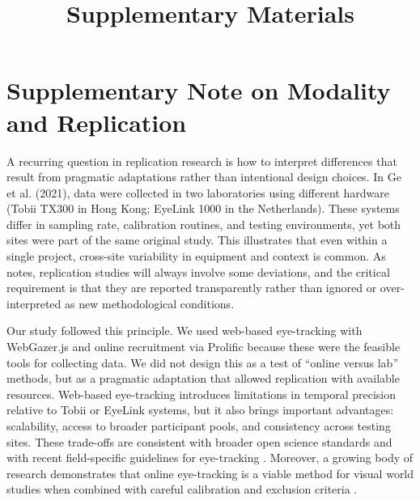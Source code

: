 \documentclass[sn-apa]{sn-jnl} %
\begin{document}
\title[Supplementary Materials]{Supplementary Materials}

\maketitle

\section{Supplementary Note on Modality and Replication}

A recurring question in replication research is how to interpret differences
that result from pragmatic adaptations rather than intentional design choices.
In Ge et al. (2021), data were collected in two laboratories using different
hardware (Tobii TX300 in Hong Kong; EyeLink 1000 in the Netherlands). These
systems differ in sampling rate, calibration routines, and testing environments,
yet both sites were part of the same original study. This illustrates that even
within a single project, cross-site variability in equipment and context is
common. As \textcite{mcmanus2024} notes, replication studies will always involve
some deviations, and the critical requirement is that they are reported
transparently rather than ignored or over-interpreted as new methodological
conditions.

Our study followed this principle. We used web-based eye-tracking with
WebGazer.js and online recruitment via Prolific because these were the feasible
tools for collecting data. We did not design this as a test of “online versus
lab” methods, but as a pragmatic adaptation that allowed replication with
available resources. Web-based eye-tracking introduces limitations in temporal
precision relative to Tobii or EyeLink systems, but it also brings important
advantages: scalability, access to broader participant pools, and consistency
across testing sites. These trade-offs are consistent with broader open science
standards \parencite{goodman2016reproducibility} and with recent
field-specific guidelines for eye-tracking \parencite{godfroid2025reporting}. Moreover,
a growing body of research demonstrates that online eye-tracking is a viable
method for visual world studies when combined with careful calibration and
exclusion criteria \parencite[e.g.,][]{AOW}. 
\end{document}
